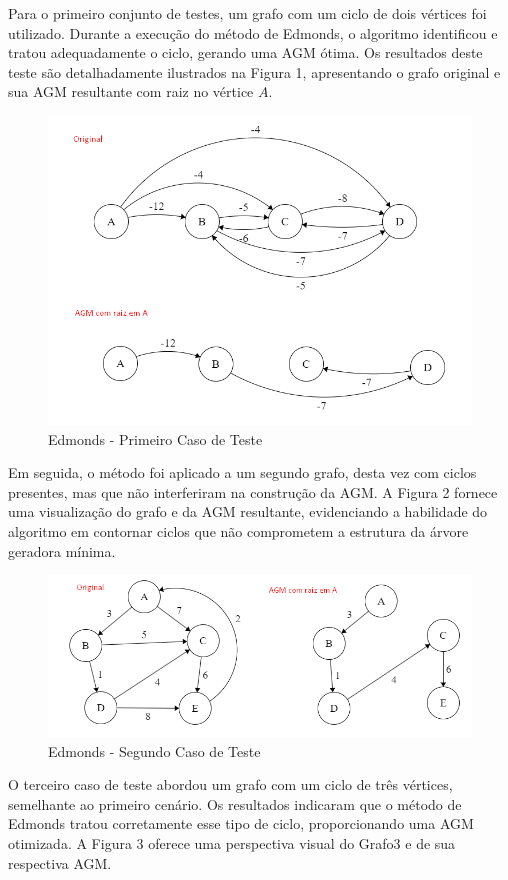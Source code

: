 \documentclass[12pt]{article}
\begin{document}
Para o primeiro conjunto de testes, um grafo com um ciclo de dois vértices foi utilizado. Durante a execução do método de Edmonds, o algoritmo identificou e tratou adequadamente o ciclo, gerando uma AGM ótima. Os resultados deste teste são detalhadamente ilustrados na Figura 1, apresentando o grafo original e sua AGM resultante com raiz no vértice \(A\).

\begin{figure}[ht]
\centering
\includegraphics[width=.75\textwidth]{AGM/Exemplo 1.png}
\caption{Edmonds - Primeiro Caso de Teste}
\end{figure}

Em seguida, o método foi aplicado a um segundo grafo, desta vez com ciclos presentes, mas que não interferiram na construção da AGM. A Figura 2 fornece uma visualização do grafo e da AGM resultante, evidenciando a habilidade do algoritmo em contornar ciclos que não comprometem a estrutura da árvore geradora mínima.

\begin{figure}[ht]
\centering
\includegraphics[width=.85\textwidth]{AGM/Exemplo 2.png}
\caption{Edmonds - Segundo Caso de Teste}
\end{figure}

O terceiro caso de teste abordou um grafo com um ciclo de três vértices, semelhante ao primeiro cenário. Os resultados indicaram que o método de Edmonds tratou corretamente esse tipo de ciclo, proporcionando uma AGM otimizada. A Figura 3 oferece uma perspectiva visual do Grafo3 e de sua respectiva AGM.
\end{document}
